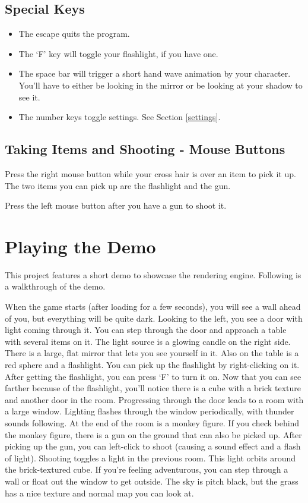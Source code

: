 \documentclass{book}
\begin{document}
    \subsection{Special Keys}
      \begin{itemize}
        \item The escape quits the program.
        \item The `F' key will toggle your flashlight, if you have one.
        \item The space bar will trigger a short hand wave animation by your character. You'll have to either be looking in the mirror or be looking at your shadow to see it.
        \item The number keys toggle settings. See Section \ref{settings}.
      \end{itemize}

    \subsection{Taking Items and Shooting - Mouse Buttons}
      Press the right mouse button while your cross hair is over an item to pick it up. The two items you can pick up are the flashlight and the gun.

      Press the left mouse button after you have a gun to shoot it.

  \section{Playing the Demo}
    This project features a short demo to showcase the rendering engine. Following is a walkthrough of the demo.

    When the game starts (after loading for a few seconds), you will see a wall ahead of you, but everything will be quite dark. Looking to the left, you see a door with light coming through it. You can step through the door and approach a table with several items on it. The light source is a glowing candle on the right side. There is a large, flat mirror that lets you see yourself in it. Also on the table is a red sphere and a flashlight. You can pick up the flashlight by right-clicking on it. After getting the flashlight, you can press `F' to turn it on. Now that you can see farther because of the flashlight, you'll notice there is a cube with a brick texture and another door in the room. Progressing through the door leads to a room with a large window. Lighting flashes through the window periodically, with thunder sounds following. At the end of the room is a monkey figure. If you check behind the monkey figure, there is a gun on the ground that can also be picked up. After picking up the gun, you can left-click to shoot (causing a sound effect and a flash of light). Shooting toggles a light in the previous room. This light orbits around the brick-textured cube. If you're feeling adventurous, you can step through a wall or float out the window to get outside. The sky is pitch black, but the grass has a nice texture and normal map you can look at.
\end{document}
